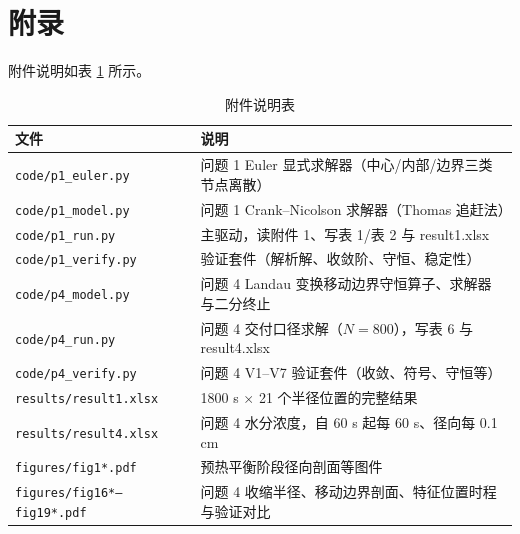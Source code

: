 \appendix
\section{附录}
附件说明如表 \ref{tab:appendix} 所示。

\begin{table}[H]
  \centering
  \caption{附件说明表}
  \label{tab:appendix}
  \begin{tabular}{lp{9.6cm}}
    \toprule
    文件 & 说明 \\
    \midrule
    \texttt{code/p1\_euler.py} & 问题 1 Euler 显式求解器（中心/内部/边界三类节点离散） \\
    \texttt{code/p1\_model.py} & 问题 1 Crank--Nicolson 求解器（Thomas 追赶法） \\
    \texttt{code/p1\_run.py} & 主驱动，读附件 1、写表 1/表 2 与 result1.xlsx \\
    \texttt{code/p1\_verify.py} & 验证套件（解析解、收敛阶、守恒、稳定性） \\
    \texttt{code/p4\_model.py} & 问题 4 Landau 变换移动边界守恒算子、求解器与二分终止 \\
    \texttt{code/p4\_run.py} & 问题 4 交付口径求解（$N=800$），写表 6 与 result4.xlsx \\
    \texttt{code/p4\_verify.py} & 问题 4 V1--V7 验证套件（收敛、符号、守恒等） \\
    \texttt{results/result1.xlsx} & 1800 s $\times$ 21 个半径位置的完整结果 \\
    \texttt{results/result4.xlsx} & 问题 4 水分浓度，自 60 s 起每 60 s、径向每 0.1 cm \\
    \texttt{figures/fig1*.pdf} & 预热平衡阶段径向剖面等图件 \\
    \texttt{figures/fig16*--fig19*.pdf} & 问题 4 收缩半径、移动边界剖面、特征位置时程与验证对比 \\
    \bottomrule
  \end{tabular}
\end{table}

